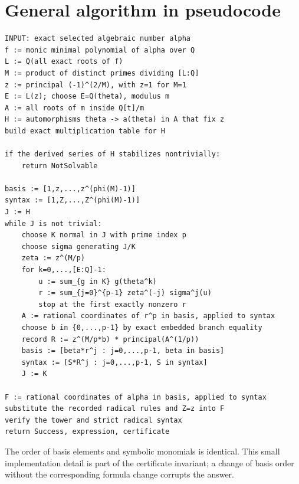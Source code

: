\documentclass[11pt,letterpaper]{article}
\theoremstyle{definition}\newtheorem{definition}[theorem]{Definition}
\theoremstyle{remark}\newtheorem{remark}[theorem]{Remark}
\begin{document}
\clearpage
\section{General algorithm in pseudocode}
\begin{lstlisting}
INPUT: exact selected algebraic number alpha
f := monic minimal polynomial of alpha over Q
L := Q(all exact roots of f)
M := product of distinct primes dividing [L:Q]
z := principal (-1)^(2/M), with z=1 for M=1
E := L(z); choose E=Q(theta), modulus m
A := all roots of m inside Q[t]/m
H := automorphisms theta -> a(theta) in A that fix z
build exact multiplication table for H

if the derived series of H stabilizes nontrivially:
    return NotSolvable

basis := [1,z,...,z^(phi(M)-1)]
syntax := [1,Z,...,Z^(phi(M)-1)]
J := H
while J is not trivial:
    choose K normal in J with prime index p
    choose sigma generating J/K
    zeta := z^(M/p)
    for k=0,...,[E:Q]-1:
        u := sum_{g in K} g(theta^k)
        r := sum_{j=0}^{p-1} zeta^(-j) sigma^j(u)
        stop at the first exactly nonzero r
    A := rational coordinates of r^p in basis, applied to syntax
    choose b in {0,...,p-1} by exact embedded branch equality
    record R := z^(M/p*b) * principal(A^(1/p))
    basis := [beta*r^j : j=0,...,p-1, beta in basis]
    syntax := [S*R^j : j=0,...,p-1, S in syntax]
    J := K

F := rational coordinates of alpha in basis, applied to syntax
substitute the recorded radical rules and Z=z into F
verify the tower and strict radical syntax
return Success, expression, certificate
\end{lstlisting}
The order of basis elements and symbolic monomials is identical. This
small implementation detail is part of the certificate invariant; a change
of basis order without the corresponding formula change corrupts the answer.
\end{document}
